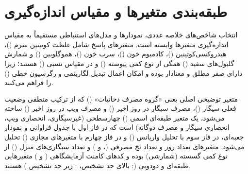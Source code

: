 \documentclass[12pt]{exam}
\begin{document}
\section{طبقه‌بندی متغیرها و مقیاس اندازه‌گیری}

انتخاب شاخص‌های خلاصه عددی، نمودارها و مدل‌های استنباطی مستقیماً به مقیاس اندازه‌گیری متغیرها وابسته است. متغیرهای پاسخ شامل غلظت کوتینین سرم ()، هیدروکسی‌کوتینین ()، کادمیوم خون ()، سرب خون ()، هموگلوبین () و شمارش گلبول‌های سفید () همگی از نوع کمی پیوسته () و در مقیاس نسبی () هستند؛ زیرا دارای صفر مطلق و معنادار بوده و امکان اعمال تبدیل لگاریتمی و رگرسیون خطی () را فراهم می‌کنند.

متغیر توضیحی اصلی یعنی «گروه مصرف دخانیات» () که از ترکیب منطقی وضعیت فعلی سیگار ()، مصرف سیگار در  روز اخیر () و مصرف ویپ در  روز اخیر () ساخته می‌شود، یک متغیر طبقه‌ای اسمی () چهارسطحی (غیرسیگاری، انحصاری ویپ، انحصاری سیگار و مصرف دوگانه) است که در فاز اول با جدول فراوانی و نمودار جعبه‌ای، در فاز سوم با تحلیل واریانس () و در فاز چهارم با متغیرهای مجازی () تحلیل می‌شود. متغیرهای تعداد روز و تعداد نخ مصرفی (،  و ) و تعداد سیگاری‌های منزل () از نوع کمی گسسته (شمارشی) بوده و کدهای کامنت آزمایشگاهی ( و ) متغیرهایی طبقه‌ای و دودویی (: بالای حد تشخیص، : زیر حد تشخیص ) هستند.
\end{document}
